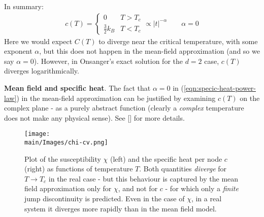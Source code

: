 \documentclass[../../main.tex]{subfiles}
\begin{document}
In summary: %
\begin{align}\label{eqn:specific-heat-power-law}
    c(T) = \begin{cases}
        0 & T > T_c\\
        \frac{3}{2}k_B & T<T_c 
    \end{cases} \propto |t|^{-\alpha} \qquad \alpha = 0 
\end{align} 
Here we would expect $C(T)$ to diverge near the critical temperature, with some exponent $\alpha$, but this does not happen in the mean-field approximation (and so we say $\alpha=0$). However, in Onsanger's exact solution for the $d=2$ case, $c(T)$ diverges logarithmically. 

\begin{appr}\textbf{Mean field and specific heat}. The fact that $\alpha=0$ in (\ref{eqn:specic-heat-power-law}) in the mean-field approximation can be justified by examining $c(T)$ on the complex plane - as a purely abstract function (clearly a \textit{complex} temperature does not make any physical sense). See [] %
for more details.
\end{appr}

\begin{figure}[H]
    \centering
    \texttt{[image: \\main/Images/chi-cv.png]}
    \caption{Plot of the susceptibility $\chi$ (left) and the specific heat per node $c$ (right) as functions of temperature $T$. Both quantities \textit{diverge} for $T \to T_c$ in the real case - but this behaviour is captured by the mean field approximation only for $\chi$, and not for $c$ - for which only a \textit{finite} jump discontinuity is predicted. Even in the case of $\chi$, in a real system it diverges more rapidly than in the mean field model.}
    \label{fig:chi-cv}
\end{figure}
\end{document}
